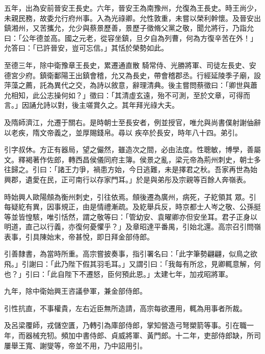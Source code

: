 \begin{pinyinscope}
 五年，出為安前晉安王長史。六年，晉安王為南豫州，允復為王長史。時王尚少，未親民務，故委允行府州事。入為光祿卿。允性敦重，未嘗以榮利幹懷。及晉安出鎮湘州，又苦攜允，允少與蔡景歷善，景歷子徵脩父黨之敬，聞允將行，乃詣允曰：「公年德並高。國之元老，從容坐鎮，旦夕自為列曹，何為方復辛苦在外！」允答曰：「已許晉安，豈可忘信。」其恬於榮勢如此。



 至德三年，除中衛豫章王長史，累遷通直散
 騎常侍、光勝將軍、司徒左長史、安德宮少府。鎮衛鄱陽王出鎮會稽，允又為長史，帶會稽郡丞。行經延陵季子廟，設萍藻之薦，託為異代之交，為詩以敘意，辭理清典。後主嘗問蔡徵曰：「卿世與蕭允相知，此公志操何如？」徵曰：「其清虛玄遠，殆不可測，至於文章，可得而言。」因誦允詩以對，後主嗟賞久之。其年拜光祿大夫。



 及隋師濟江，允遷于關右。是時朝士至長安者，例並授官，唯允與尚書僕射謝伷辭以老疾，隋文帝義之，並厚賜錢帛。尋以
 疾卒於長安，時年八十四。弟引。



 引字叔休。方正有器局，望之儼然，雖造次之間，必由法度。性聰敏，博學，善屬文。釋褐著作佐郎，轉西昌侯儀同府主簿。侯景之亂，梁元帝為荊州刺史，朝士多往歸之。引曰：「諸王力爭，禍患方始，今日逃難，未是擇君之秋。吾家再世為始興郡，遺愛在民，正可南行以存家門耳。」於是與弟彤及宗親等百餘人奔嶺表。



 時始興人歐陽頠為衡州刺史，引往依焉。頠後遷為廣州，病死，子紇領其
 眾。引每疑紇有異，因事規正，由是情禮漸疏。及紇舉兵反，時京都士人岑之敬、公孫挺等並皆惶駭，唯引恬然，謂之敬等曰：「管幼安、袁曜卿亦但安坐耳。君子正身以明道，直己以行義，亦復何憂懼乎？」及章昭達平番禺，引始北還。高宗召引問嶺表事，引具陳始末，帝甚悅，即日拜金部侍郎。



 引善隸書，為當時所重。高宗嘗披奏事，指引署名曰：「此字筆勢翩翩，似鳥之欲飛。」引謝曰：「此乃陛下假其羽毛耳。」又謂引曰：「我每有所忿，見卿輒意解，何
 也？」引曰：「此自陛下不遷怒，臣何預此恩。」太建七年，加戎昭將軍。



 九年，除中衛始興王咨議參軍，兼金部侍郎。



 引性抗直，不事權貴，左右近臣無所造請，高宗每欲遷用，輒為用事者所裁。



 及呂梁覆師，戎儲空匱，乃轉引為庫部侍郎，掌知營造弓弩槊箭等事。引在職一年，而器械充牣。頻加中書侍郎、貞威將軍、黃門郎。十二年，吏部侍郎缺，所司屢舉王寬、謝燮等，帝並不用，乃中詔用引。




\end{pinyinscope}
